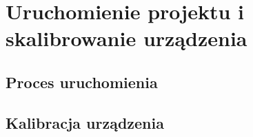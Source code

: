 \chapter{Uruchomienie projektu i skalibrowanie urządzenia}
\section{Proces uruchomienia}
\section{Kalibracja urządzenia}
